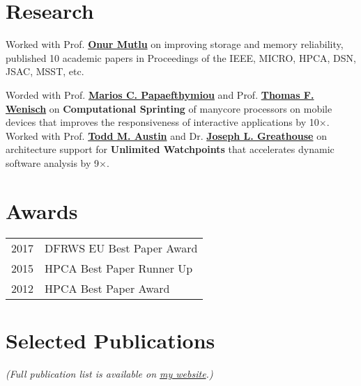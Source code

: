 \documentclass[]{resume}
\begin{document}
\begin{minipage}[t]{0.64\textwidth}

\section{Research}
Worked with Prof\@. \textbf{\href{http://users.ece.cmu.edu/~omutlu/}{Onur Mutlu}} on improving storage and memory reliability, published 10 academic papers in Proceedings of the IEEE, MICRO, HPCA, DSN, JSAC, MSST, etc.
\sectionsep%

Worded with Prof\@. \textbf{\href{http://web.eecs.umich.edu/~marios/}{Marios C. Papaefthymiou}} and Prof\@. \textbf{\href{http://web.eecs.umich.edu/~twenisch/}{Thomas F. Wenisch}} on \textbf{Computational Sprinting} of manycore processors on mobile devices that improves the responsiveness of interactive applications by 10$\times$. \\
Worked with Prof\@. \textbf{\href{http://web.eecs.umich.edu/~taustin/}{Todd M. Austin}} and Dr\@. \textbf{\href{http://www.computermachines.org/joe/}{Joseph L. Greathouse}} on architecture support for \textbf{Unlimited Watchpoints} that accelerates dynamic software analysis by 9$\times$.


\section{Awards}
\begin{tabular}{rl}
2017 & DFRWS EU Best Paper Award \\
2015 & HPCA Best Paper Runner Up \\
2012 & HPCA Best Paper Award
\end{tabular}
\sectionsep%


\section{Selected Publications}
\textit{(Full publication list is available on \href{http://www.yixinluo.com}{my website}.)}

\setlength{\bibsep}{3pt plus 0.3ex}


\nocite{*}

\end{minipage}
\end{document}
